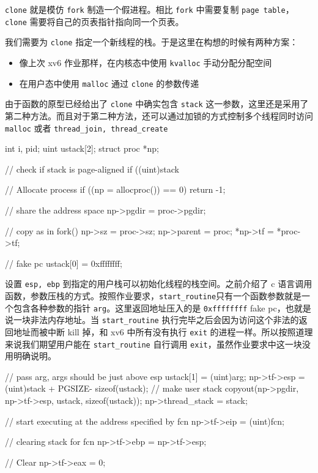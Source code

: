 \texttt{clone} 就是模仿 \texttt{fork} 制造一个假进程。相比 \texttt{fork} 中需要复制 \texttt{page table}，\texttt{clone} 需要将自己的页表指针指向同一个页表。

我们需要为 \texttt{clone} 指定一个新线程的栈。于是这里在构想的时候有两种方案：

\begin{itemize}
    \item 像上次 xv6 作业那样，在内核态中使用 \texttt{kvalloc} 手动分配分配空间
    \item 在用户态中使用 \texttt{malloc} 通过 \texttt{clone} 的参数传递
\end{itemize}

由于函数的原型已经给出了 \texttt{clone} 中确实包含 \texttt{stack} 这一参数，这里还是采用了第二种方法。而且对于第二种方法，还可以通过加锁的方式控制多个线程同时访问 \texttt{malloc} 或者 \texttt{thread\_join, thread\_create}

\begin{ccode}
    int i, pid;
    uint ustack[2];
    struct proc *np;
                    
    // check if stack is page-aligned
    if ((uint)stack %
                    
    // Allocate process
    if ((np = allocproc()) == 0)
    return -1;
                    
    // share the address space
    np->pgdir = proc->pgdir;
                    
    // copy as in fork()
    np->sz = proc->sz;
    np->parent = proc;
    *np->tf = *proc->tf;
                    
    // fake pc
    ustack[0] = 0xffffffff;
                    
\end{ccode}

设置 \texttt{esp, ebp} 到指定的用户栈可以初始化线程的栈空间。之前介绍了 c 语言调用函数，参数压栈的方式。按照作业要求，\texttt{start\_routine}只有一个函数参数就是一个包含各种参数的指针 \texttt{arg}。这里返回地址压入的是 \texttt{0xffffffff} fake pc，也就是说一块非法内存地址。当 \texttt{start\_routine} 执行完毕之后会因为访问这个非法的返回地址而被中断 kill 掉，和 xv6 中所有没有执行 \texttt{exit} 的进程一样。所以按照道理来说我们期望用户能在 \texttt{start\_routine} 自行调用 \texttt{exit}，虽然作业要求中这一块没用明确说明。

\begin{ccode}
    // pass arg, args should be just above esp
    ustack[1] = (uint)arg;
    np->tf->esp = (uint)stack + PGSIZE- sizeof(ustack);
    // make user stack
    copyout(np->pgdir, np->tf->esp, ustack, sizeof(ustack));
    np->thread_stack = stack;
                  
    // start executing at the address specified by fcn
    np->tf->eip = (uint)fcn;
                  
    // clearing stack for fcn
    np->tf->ebp = np->tf->esp;
                  
    // Clear %
    np->tf->eax = 0;
\end{ccode}

